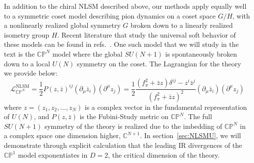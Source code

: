 \documentclass[11pt,letter]{article}
\def\sect#1{section~\ref{#1}}
\begin{document}
In addition to the chiral NLSM described above, our methods apply equally well to a symmetric coset model describing pion dynamics on a coset space $G/H$, with a nonlinearly realized global symmetry $G$ broken down to a linearly realized isometry group $H$. Recent literature that study the universal soft behavior of these models can be found in refs.~\cite{Low:2014nga,Low:2017mlh,Liu:2018vel,Low:2018acv}. One such model that we will study in the text is the $\mathbb{CP}^N$ model where the global $SU(N+1)$ is spontaneously broken down to a local $U(N)$ symmetry on the coset. The Lagrangian for the theory we provide below:
\begin{equation}\label{eq:CPNLag}
\mathcal{L}^{\text{NLSM}}_{\mathbb{CP}^N} = \frac{1}{2}P(z,\bar{z})^{ij}(\partial_\mu \bar{z}_i)(\partial^\mu z_j)=\frac{1}{2}\frac{(f_\pi^2+\bar{z} z)\delta^{ij}-z^i\bar{z}^j}{(f_\pi^{2}+\bar{z} z)^2}(\partial_\mu \bar{z}_i)(\partial^\mu z_j)
\end{equation}
where $z=(z_1,z_2,...,z_N)$ is a complex vector in the fundamental representation of $U(N)$, and $P(z,\bar{z})$ is the Fubini-Study metric on $\mathbb{CP}^N$. The full $SU(N+1)$ symmetry of the theory is realized due to the imbedding of $\mathbb{CP}^N$ in a complex space one dimension higher, $\mathbb{C}^{N+1}$. In \sect{sec:NLSMU}, we will demonstrate through explicit calculation that the leading IR divergences of the $\mathbb{CP}^1$ model exponentiates in $D=2$, the critical dimension of the theory. 
\end{document}
